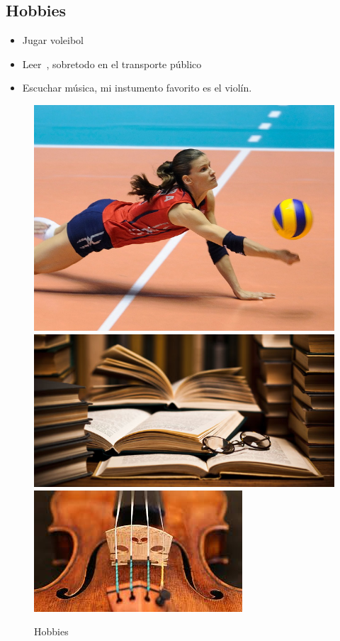 \subsection{Hobbies}
\begin{itemize}
\item Jugar voleibol
\item Leer~\cite{torres,comunidad,retorno}, sobretodo en el transporte público
\item Escuchar música, mi instumento favorito es el violín.
\end{itemize}
\begin{figure}[h!]
  \centering
  {\includegraphics[scale=0.25]{IMG/7_2.jpg}}
  {\includegraphics[scale=0.29]{IMG/7_3.jpg}}
  {\includegraphics[scale=0.54]{IMG/7_4.jpg}}
  \caption{Hobbies}
\end{figure}
